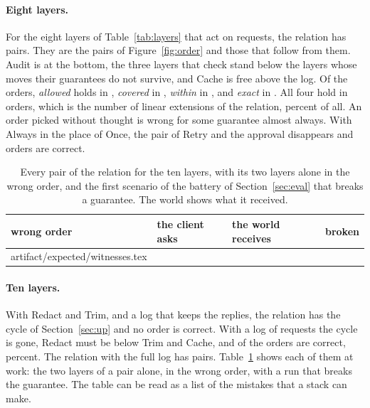 \documentclass[acmsmall,nonacm,screen]{acmart}
\makeatletter
\newcommand{\ly}[1]{\textsf{#1}}
\newcommand{\claim}[2]{#2}
\newcommand{\rows}[1]{\@@input artifact/expected/#1.tex }
\makeatother
\begin{document}
\paragraph{Eight layers.} For the eight layers of Table~\ref{tab:layers} that act on
requests, the relation has \exEightPairs{} pairs. \claim{eight-pairs}{They are the pairs of
Figure~\ref{fig:order} and those that follow from them.} \ly{Audit} is at the bottom, the
three layers that check stand below the layers whose moves their guarantees do not survive,
and \ly{Cache} is free above the log. Of the \exEightOrders{} orders, \emph{allowed} holds in
\exEightAllowed{}, \emph{covered} in \exEightCovered{}, \emph{within} in \exEightWithin{},
and \emph{exact} in \exEightExact{}. \claim{eight-orders}{All four hold in \exEightGood{}
orders, which is the number of linear extensions of the relation}, \exEightShare{} percent
of all. An order picked without thought is wrong for some guarantee almost always.
\claim{always-more}{With \ly{Always} in the place of \ly{Once}, the pair of \ly{Retry} and
the approval disappears and \exEightAlways{} orders are correct.}

\begin{table}
\caption{Every pair of the relation for the ten layers, with its two layers alone in the
wrong order, and the first scenario of the battery of Section~\ref{sec:eval} that breaks a
guarantee. The world shows what it received.}
\label{tab:witnesses}
\small
\begin{tabular}{llll}
\toprule
wrong order & the client asks & the world receives & broken \\
\midrule
\rows{witnesses}
\bottomrule
\end{tabular}
\end{table}

\paragraph{Ten layers.} With \ly{Redact} and \ly{Trim}, and a log that keeps the replies,
the relation has the cycle of Section~\ref{sec:up} and no order is correct. With a log of
requests the cycle is gone, \ly{Redact} must be below \ly{Trim} and \ly{Cache}, and
\exTenWeak{} of the \exTenOrders{} orders are correct, \exTenShare{} percent. The relation
with the full log has \exTenPairs{} pairs. \claim{witnesses}{Table~\ref{tab:witnesses} shows
each of them at work}: the two layers of a pair alone, in the wrong order, with a run that
breaks the guarantee. The table can be read as a list of the mistakes that a stack can make.
\end{document}
